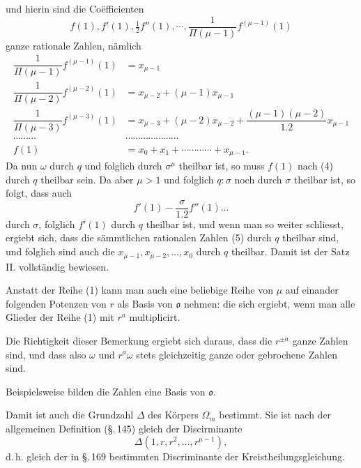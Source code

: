 und hierin sind die Co\"efficienten
\[
f(1), f'(1), \tfrac12 f''(1), \cdots, \dfrac{1}{\Pi(\mu-1)} f^{(\mu-1)}(1)
\]
ganze rationale Zahlen, n\"amlich
\begin{align*}
\dfrac{1}{\Pi(\mu-1)} f^{(\mu-1)}(1) &= x_{\mu-1} \\[6pt]
\dfrac{1}{\Pi(\mu-2)} f^{(\mu-2)}(1) &= x_{\mu-2}+(\mu-1)x_{\mu-1} \\[6pt]
\dfrac{1}{\Pi(\mu-3)} f^{(\mu-3)}(1) &= x_{\mu-3}+(\mu-2)x_{\mu-2}+\dfrac{(\mu-1)(\mu-2)}{1.2}x_{\mu-1} \tag{5}\\[6pt]
\cdots\cdots\cdots &\cdots\cdots\cdots\cdots\cdots\cdots\cdots \\[6pt]
f(1) &= x_0+x_1+\cdots\cdots\cdots\cdots+x_{\mu-1}.
\end{align*}
Da nun $\omega$ durch $q$ und folglich durch $\sigma^\mu$ theilbar ist, so
muss $f(1)$ nach (4) durch $q$ theilbar sein. Da aber $\mu>1$ und
folglich $q:\sigma$ noch durch $\sigma$ theilbar ist, so folgt, dass auch
\[
f'(1) - \dfrac{\sigma}{1.2} f''(1) \ldots
\]
durch $\sigma$, folglich $f'(1)$ durch $q$ theilbar ist, und wenn man so
weiter schliesst, ergiebt sich, dass die s\"ammtlichen rationalen
Zahlen (5) durch $q$ theilbar sind, und folglich sind auch die
$x_{\mu-1}, x_{\mu-2}, \ldots, x_0$ durch $q$ theilbar. Damit ist der Satz II. vollst\"andig bewiesen.

Anstatt der Reihe (1) kann man auch eine beliebige Reihe von
$\mu$ auf einander folgenden Potenzen von $r$ als Basis von $\mathfrak{o}$ nehmen:
die sich ergiebt, wenn man alle Glieder der Reihe (1) mit $r^a$
multiplicirt.

Die Richtigkeit dieser Bemerkung ergiebt sich daraus, dass
die $r^{\pm a}$ ganze Zahlen sind, und dass also $\omega$ und $r^a\omega$ stets gleichzeitig ganze oder gebrochene Zahlen sind.

Beispielsweise bilden die Zahlen
eine Basis von $\mathfrak{o}$.

Damit ist auch die Grundzahl $\Delta$ des K\"orpers $\Omega_m$ bestimmt.
Sie ist nach der allgemeinen Definition (\S.\,145) gleich der Discirminante %
\[
\Delta(1, r, r^2, \ldots, r^{\mu-1}),
\]
d.\,h. gleich der in \S.\,169 bestimmten Discriminante der Kreistheilungsgleichung.
